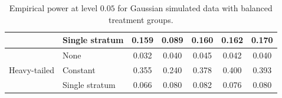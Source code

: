\documentclass[12pt]{article}
\begin{document}
\begin{table}[]
\begin{tabular}{ll|ccccc}
                              & Single stratum                                              & 0.159                      & 0.089                                                                                & 0.160                                                                                 & 0.162                                                                        & 0.170                                                                        \\ \hline
\multirow{3}{*}{Heavy-tailed} & None                                                        & 0.032                      & 0.040                                                                                & 0.045                                                                                 & 0.042                                                                        & 0.040                                                                        \\
                              & Constant                                                    & 0.355                      & 0.240                                                                                & 0.378                                                                                 & 0.400                                                                        & 0.393                                                                        \\
                              & Single stratum                                              & 0.066                      & 0.080                                                                                & 0.082                                                                                 & 0.076                                                                        & 0.080                                                                        \\ \hline
\end{tabular}
\caption{Empirical power at level $0.05$ for Gaussian simulated data with balanced treatment groups.}
\label{tab:normal_power}
\end{table}
\end{document}
